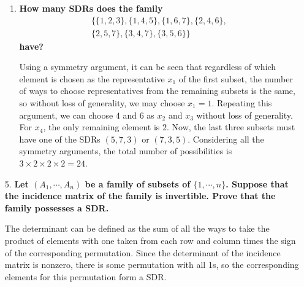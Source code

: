 \documentclass[a4paper,12pt]{article}
\begin{document}
\begin{enumerate}
\begin{enumerate}
            \item
                \boldmath
                \textbf{How many SDRs does the family
                    \begin{gather*}
                        \{ \{ 1, 2, 3 \}, \{ 1, 4, 5 \}, \{ 1, 6, 7 \}, \{ 2, 4, 6 \}, \\ \{ 2, 5, 7 \}, \{ 3, 4, 7 \}, \{ 3, 5, 6 \} \}
                    \end{gather*}
                have?} \par
                \unboldmath
                Using a symmetry argument, it can be seen that regardless of which element is chosen as the representative $x_1$ of the first subset, the number of ways to choose representatives from the remaining subsets is the same, so without loss of generality, we may choose $x_1 = 1$. Repeating this argument, we can choose $4$ and $6$ as $x_2$ and $x_3$ without loss of generality. For $x_4$, the only remaining element is $2$. Now, the last three subsets must have one of the SDRs $(5, 7, 3)$ or $(7, 3, 5)$. Considering all the symmetry arguments, the total number of possibilities is $3 \times 2 \times 2 \times 2 = 24$.
        \end{enumerate}

    \item[5.]
        \boldmath
        \textbf{Let $(A_1, \cdots, A_n)$ be a family of subsets of $\{ 1, \cdots, n \}$. Suppose that the incidence matrix of the family is invertible. Prove that the family possesses a SDR.} \par
        \unboldmath
        The determinant can be defined as the sum of all the ways to take the product of elements with one taken from each row and column times the sign of the corresponding permutation. Since the determinant of the incidence matrix is nonzero, there is some permutation with all 1s, so the corresponding elements for this permutation form a SDR.


\end{enumerate}
\end{document}
